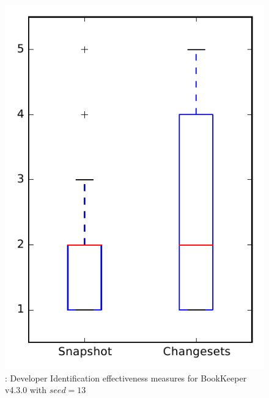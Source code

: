 
\begin{figure}
\centering
\includegraphics[height=0.4\textheight]{figures/dit_seed/rq1_bookkeeper_13}
\caption{\rtwo: Developer Identification effectiveness measures for BookKeeper v4.3.0 with $seed=13$}
\label{fig:dit_seed:rq1:bookkeeper}
\end{figure}

